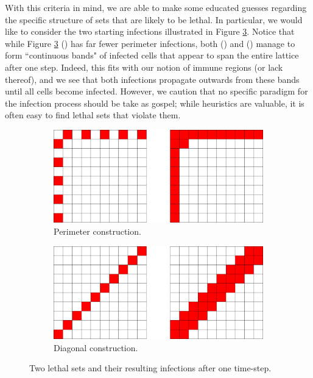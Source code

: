 With this criteria in mind, we are able to make some educated guesses regarding the specific structure of sets that are likely to be lethal. In particular, we would like to consider the two starting infections illustrated in Figure \ref{fig:two_infections}. Notice that while Figure \ref{fig:two_infections} () has far fewer perimeter infections, both () and () manage to form ``continuous bands" of infected cells that appear to span the entire lattice after one step. Indeed, this fits with our notion of immune regions (or lack thereof), and we see that both infections propagate outwards from these bands until all cells become infected. However, we caution that no specific paradigm for the infection process should be take as gospel; while heuristics are valuable, it is often easy to find lethal sets that violate them.

\begin{figure}[]
\centering
\begin{subfigure}{0.45\textwidth}
	\includegraphics[width=\textwidth]{figures/1/two_infections_a.pdf}
	\caption{Perimeter construction.}
	\label{fig:two_infections_a}
\end{subfigure} \hfill%
\begin{subfigure}{0.45\textwidth}
	\includegraphics[width=\textwidth]{figures/1/two_infections_b.pdf}
	\caption{Diagonal construction.}
	\label{fig:two_infections_b}
\end{subfigure}
\caption{Two lethal sets and their resulting infections after one time-step.}
\label{fig:two_infections}
\end{figure} 

